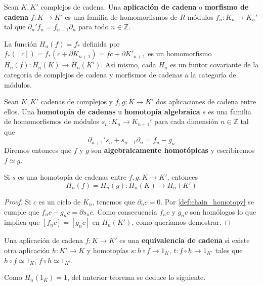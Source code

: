 \begin{definicion}
	Sean $K,K'$ complejos de cadena. Una \textbf{aplicación de cadena} o \textbf{morfismo de cadena} $f: K \rightarrow K'$ es una familia de homomorfismos de $R$-módulos $f_n: K_n \rightarrow K_n'$ tal que $\partial_n'f_n = f_{n-1}\partial_n$ para todo $n \in \mathbb{Z}$.
\end{definicion}

La función $H_n(f) = f_*$ definida por $f_*([c]) = f_*(c + \partial K_{n+1}) = fc + \partial K'_{n+1}$ es un homomorfismo $H_n(f): H_n(K) \rightarrow H_n(K')$. Así mismo, cada $H_n$ es un funtor covariante de la categoría de complejos de cadena y morfismos de cadenas a la categoría de módulos.

\begin{definicion}\label{def:chain_homotopy}
	Sean $K,K'$ cadenas de complejos y $f,g: K \rightarrow K'$ dos aplicaciones de cadena entre ellos. Una \textbf{homotopía de cadenas} u \textbf{homotopía algebraica} $s$ es una familia de homomorfismos de módulos $s_n: K_n \rightarrow K_{n+1}'$ para cada dimensión $n \in \mathbb{Z}$ tal que
	\begin{equation}
		\partial_{n+1}'s_n + s_{n-1} \partial_n = f_n - g_n
	\end{equation}
	Diremos entonces que $f$ y $g$ son \textbf{algebraicamente homotópicas} y escribiremos $f \simeq g$.
\end{definicion}

\begin{teorema}
	Si $s$ es una homotopía de cadenas entre $f,g: K \rightarrow K'$, entonces
	\[ H_n(f) = H_n(g) : H_n(K) \rightarrow H_n(K') \]
\end{teorema}
\begin{proof}
	Si $c$ es un ciclo de $K_n$, tenemos que $\partial_n c = 0$. Por \ref{def:chain_homotopy} se cumple que $f_nc-g_nc =  \partial s_n c$. Como consecuencia $f_n c$ y $g_n c$ son homólogos lo que implica que $[f_nc] = [g_n c]$ en $H_n(K')$, como queríamos demostrar.
\end{proof}

\begin{definicion}
	Una aplicación de cadena $f: K \rightarrow K'$ es una \textbf{equivalencia de cadena} si existe otra aplicación $h: K' \rightarrow K$ y homotopías $s: h \circ f \rightarrow 1_K$, $t: f \circ h \rightarrow 1_{K'}$ tales que $h \circ f \simeq 1_K$, $f \circ h \simeq 1_{K'}$.
\end{definicion}

Como $H_n(1_K) = 1$, del anterior teorema se deduce lo siguiente.


